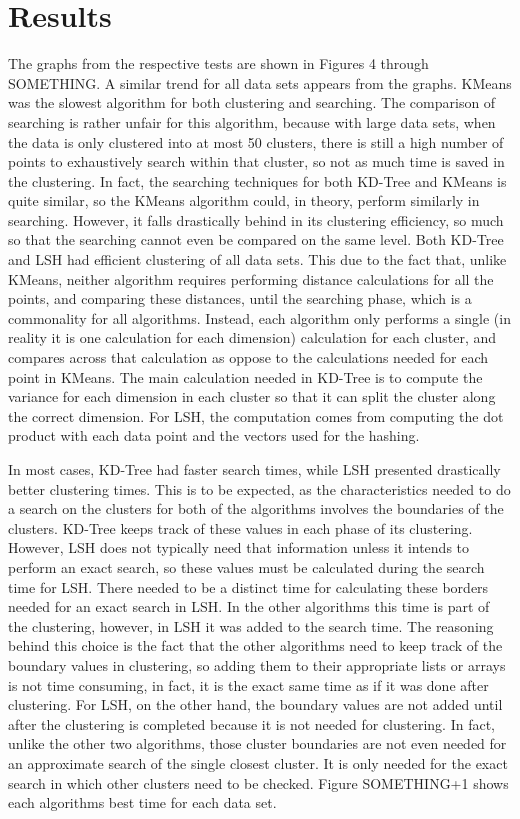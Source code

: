 \documentclass[journal]{IEEEtran}
\begin{document}
\section{Results}
The graphs from the respective tests are shown in Figures 4 through SOMETHING. A similar trend for all data sets appears from the graphs. KMeans was the slowest algorithm for both clustering and searching. The comparison of searching is rather unfair for this algorithm, because with large data sets, when the data is only clustered into at most 50 clusters, there is still a high number of points to exhaustively search within that cluster, so not as much time is saved in the clustering. In fact, the searching techniques for both KD-Tree and KMeans is quite similar, so the KMeans algorithm could, in theory, perform similarly in searching. However, it falls drastically behind in its clustering efficiency, so much so that the searching cannot even be compared on the same level. Both KD-Tree and LSH had efficient clustering of all data sets. This due to the fact that, unlike KMeans, neither algorithm requires performing distance calculations for all the points, and comparing these distances, until the searching phase, which is a commonality for all algorithms. Instead, each algorithm only performs a single (in reality it is one calculation for each dimension) calculation for each cluster, and compares across that calculation as oppose to the calculations needed for each point in KMeans. The main calculation needed in KD-Tree is to compute the variance for each dimension in each cluster so that  it can split the cluster along the correct dimension. For LSH, the computation comes from computing the dot product with each data point and the vectors used for the hashing. \par

In most cases, KD-Tree had faster search times, while LSH presented drastically better clustering times. This is to be expected, as the characteristics needed to do a search on the clusters for both of the algorithms involves the boundaries of the clusters. KD-Tree keeps track of these values in each phase of its clustering. However, LSH does not typically need that information unless it intends to perform an exact search, so these values must be calculated during the search time for LSH. There needed to be a distinct time for calculating these borders needed for an exact search in LSH. In the other algorithms this time is part of the clustering, however, in LSH it was added to the search time. The reasoning behind this choice is the fact that the other algorithms need to keep track of the boundary values in clustering, so adding them to their appropriate lists or arrays is not time consuming, in fact, it is the exact same time as if it was done after clustering. For LSH, on the other hand, the boundary values are not added until after the clustering is completed because it is not needed for clustering. In fact, unlike the other two algorithms, those cluster boundaries are not even needed for an approximate search of the single closest cluster. It is only needed for the exact search in which other clusters need to be checked. Figure SOMETHING+1 shows each algorithms best time for each data set.
\end{document}

